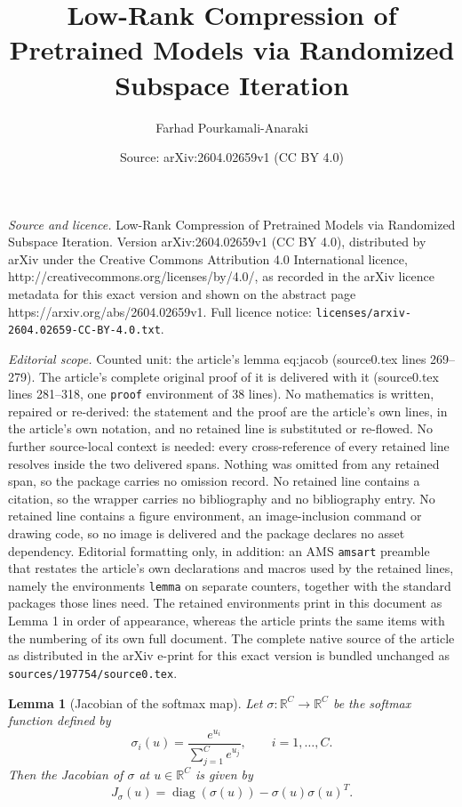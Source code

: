 \documentclass[10pt,a4paper]{amsart}
\title{\LARGE Low-Rank Compression of Pretrained Models via Randomized Subspace Iteration}
\author{Farhad Pourkamali-Anaraki}
\date{Source: arXiv:2604.02659v1 (CC BY 4.0)}
\newtheorem{lemma}{Lemma}
\begin{document}
\maketitle

\noindent\emph{Source and licence.} \LARGE Low-Rank Compression of Pretrained Models via Randomized Subspace Iteration. Version arXiv:2604.02659v1 (CC BY 4.0), distributed by arXiv under the Creative Commons Attribution 4.0 International licence, http://creativecommons.org/licenses/by/4.0/, as recorded in the arXiv licence metadata for this exact version and shown on the abstract page https://arxiv.org/abs/2604.02659v1. Full licence notice: \texttt{licenses/arxiv-2604.02659-CC-BY-4.0.txt}.\par\smallskip

\noindent\textit{Editorial scope.} Counted unit: the article's lemma eq:jacob (source0.tex lines 269--279). The article's complete original proof of it is delivered with it (source0.tex lines 281--318, one \texttt{proof} environment of 38 lines). No mathematics is written, repaired or re-derived: the statement and the proof are the article's own lines, in the article's own notation, and no retained line is substituted or re-flowed.  No further source-local context is needed: every cross-reference of every retained line resolves inside the two delivered spans.  Nothing was omitted from any retained span, so the package carries no omission record.  No retained line contains a citation, so the wrapper carries no bibliography and no bibliography entry.  No retained line contains a figure environment, an image-inclusion command or drawing code, so no image is delivered and the package declares no asset dependency.  Editorial formatting only, in addition: an AMS \texttt{amsart} preamble that restates the article's own declarations and macros used by the retained lines, namely the environments \texttt{lemma} on separate counters, together with the standard packages those lines need.  The retained environments print in this document as Lemma 1 in order of appearance, whereas the article prints the same items with the numbering of its own full document.  The complete native source of the article as distributed in the arXiv e-print for this exact version is bundled unchanged as \texttt{sources/197754/source0.tex}.
\begin{lemma}[Jacobian of the softmax map]
Let $\sigma:\mathbb{R}^C \to \mathbb{R}^C$ be the softmax function defined by
\begin{equation}
\sigma_i(u)=\frac{e^{u_i}}{\sum_{j=1}^C e^{u_j}},
\qquad i=1,\dots,C.
\end{equation}
Then the Jacobian of $\sigma$ at $u\in\mathbb{R}^C$ is given by
\begin{equation}
J_\sigma(u)=\operatorname{diag}(\sigma(u))-\sigma(u)\sigma(u)^T.\label{eq:jacob}
\end{equation}
\end{lemma}
\end{document}
